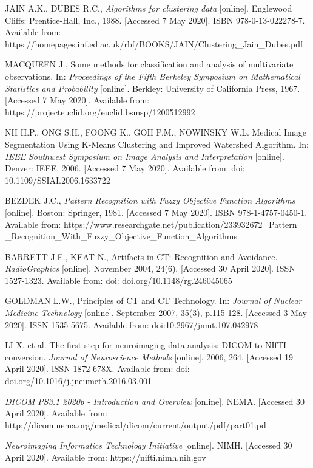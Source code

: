 \begin{thebibliography}{9}
JAIN A.K., DUBES R.C., \textit{Algorithms for clustering data} [online]. Englewood Cliffs: Prentice-Hall, Inc., 1988. [Accessed 7 May 2020]. ISBN 978-0-13-022278-7. Available from: https://homepages.inf.ed.ac.uk/rbf/BOOKS/JAIN/Clustering\_Jain\_Dubes.pdf


MACQUEEN J., Some methods for classification and analysis of multivariate observations. In: \textit{Proceedings of the Fifth Berkeley Symposium on Mathematical Statistics and Probability} [online]. Berkley: University of California Press, 1967. [Accessed 7 May 2020]. Available from: https://projecteuclid.org/euclid.bsmsp/1200512992

NH H.P., ONG S.H., FOONG K., GOH P.M., NOWINSKY W.L. Medical Image Segmentation Using K-Means Clustering and Improved Watershed Algorithm. In: \textit{IEEE Southwest Symposium on Image Analysis and Interpretation} [online]. Denver: IEEE, 2006. [Accessed 7 May 2020]. Available from: doi: 10.1109/SSIAI.2006.1633722

BEZDEK J.C., \textit{Pattern Recognition with Fuzzy Objective Function Algorithms} [online]. Boston: Springer, 1981. [Accessed 7 May 2020]. ISBN 978-1-4757-0450-1.
Available from: https://www.researchgate.net/publication/233932672\_Pattern
\_Recognition\_With\_Fuzzy\_Objective\_Function\_Algorithms

BARRETT J.F., KEAT N., Artifacts in CT: Recognition and Avoidance. \textit{RadioGraphics} [online]. November 2004, 24(6). [Accessed 30 April 2020]. ISSN 1527-1323. Available from: doi: doi.org/10.1148/rg.246045065

GOLDMAN L.W., Principles of CT and CT Technology. In: \textit{Journal of Nuclear Medicine Technology} [online]. September 2007, 35(3), p.115-128. [Accessed 3 May 2020]. ISSN 1535-5675. Available from: doi:10.2967/jnmt.107.042978


LI X. et al. The first step for neuroimaging data analysis: DICOM to NIfTI conversion. \textit{Journal of Neuroscience Methods} [online]. 2006, 264. [Accessed 19 April 2020]. ISSN 1872-678X. Available from: doi: doi.org/10.1016/j.jneumeth.2016.03.001

\textit{DICOM PS3.1 2020b - Introduction and Overview} [online]. NEMA. [Accessed 30 April 2020]. Available from: http://dicom.nema.org/medical/dicom/current/output/pdf/part01.pd

\textit{Neuroimaging Informatics Technology Initiative} [online]. NIMH. [Accessed 30 April 2020]. Available from: https://nifti.nimh.nih.gov


\end{thebibliography}
